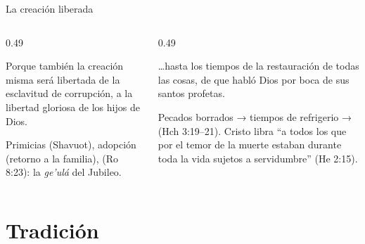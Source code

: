 \begin{frame}{La creación liberada}
\begin{columns}[t,onlytextwidth]
\begin{column}{0.49\textwidth}
\begin{cita}Porque también la creación misma será libertada de la esclavitud de corrupción, a la libertad gloriosa de los hijos de Dios.\end{cita}
\scriptsize Primicias (Shavuot), adopción (retorno a la familia),  (Ro 8:23): la \emph{ge'ulá} del Jubileo.
\end{column}
\begin{column}{0.49\textwidth}
\begin{cita}\ldots{}hasta los tiempos de la restauración de todas las cosas, de que habló Dios por boca de sus santos profetas.\end{cita}
\scriptsize Pecados borrados → tiempos de refrigerio →  (Hch 3:19--21). Cristo libra ``a todos los que por el temor de la muerte estaban durante toda la vida sujetos a servidumbre'' (He 2:15).
\end{column}
\end{columns}
\end{frame}


\section{Tradición}

